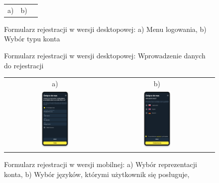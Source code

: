 \begin{figure}[H]
 \centering
  \begin{tabular}{@{}ccc@{}}
  a) & b)\\
  \end{tabular}
 \caption{Formularz rejestracji w wersji desktopowej: a) Menu logowania, b) Wybór typu konta}
 \label{fig:Formularz rejestracji - ab - desktop}
\end{figure}
\begin{figure}[H]
 \centering
 \caption{Formularz rejestracji w wersji desktopowej: Wprowadzenie danych do rejestracji}
 \label{fig:Formularz rejestracji - c - desktop}
\end{figure}
\begin{figure}[H]
 \centering
  \begin{tabular}{@{}ccc@{}}
  a) & b)\\
  \includegraphics[width=0.3\textwidth]{rozdzial1/wybor_2_m.png} &
  \includegraphics[width=0.3\textwidth]{rozdzial1/wybor_3_m.png}
  \end{tabular}
 \caption{Formularz rejestracji w wersji mobilnej: a) Wybór reprezentacji konta, b) Wybór języków, którymi użytkownik się posługuje, }
 \label{fig:Formularz rejestracji - ab2 - mobile}
\end{figure}
